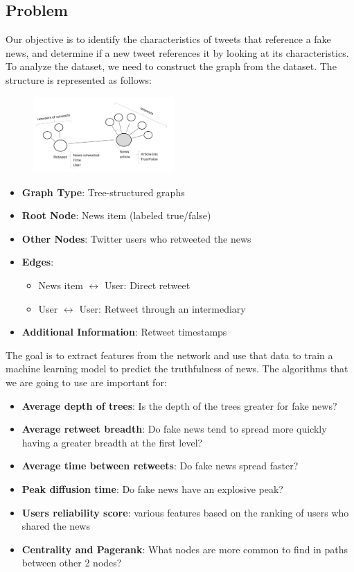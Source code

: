 \documentclass[11pt,a4paper]{article}
\begin{document}
\subsection*{Problem}
Our objective is to identify the characteristics of tweets that reference a fake news, and determine if a new tweet references it by looking at its characteristics.
To analyze the dataset, we need to construct the graph from the dataset. The structure is represented as follows:
\newline
\begin{figure}
	\begin{center}
	  \includegraphics[width=0.48\textwidth]{struct}
	\end{center}
\end{figure}
\begin{itemize}
	\setlength\itemsep{-0.3em}
	\item \textbf{Graph Type}: Tree-structured graphs
	\item \textbf{Root Node}: News item (labeled true/false)
	\item \textbf{Other Nodes}: Twitter users who retweeted the news
	\item \textbf{Edges}:
	\begin{itemize}
		\setlength\itemsep{-0.3em}
		\item News item $\leftrightarrow$ User: Direct retweet
		\item User $\leftrightarrow$ User: Retweet through an intermediary
	\end{itemize}
	\item \textbf{Additional Information}: Retweet timestamps
\end{itemize}

The goal is to extract features from the network and use that data to train a machine learning model to predict the truthfulness of news.
The algorithms that we are going to use are important for:
\begin{itemize}
	\setlength\itemsep{-0.3em}
	\item \textbf{Average depth of trees}: Is the depth of the trees greater for fake news?
	\item \textbf{Average retweet breadth}: Do fake news tend to spread more quickly having a greater breadth at the first level?
	\item \textbf{Average time between retweets}: Do fake news spread faster?
	\item \textbf{Peak diffusion time}: Do fake news have an explosive peak?
	\item \textbf{Users reliability score}: various features based on the ranking of users who shared the news
	\item \textbf{Centrality and Pagerank}: What nodes are more common to find in paths between other 2 nodes?
\end{itemize}
\end{document}

